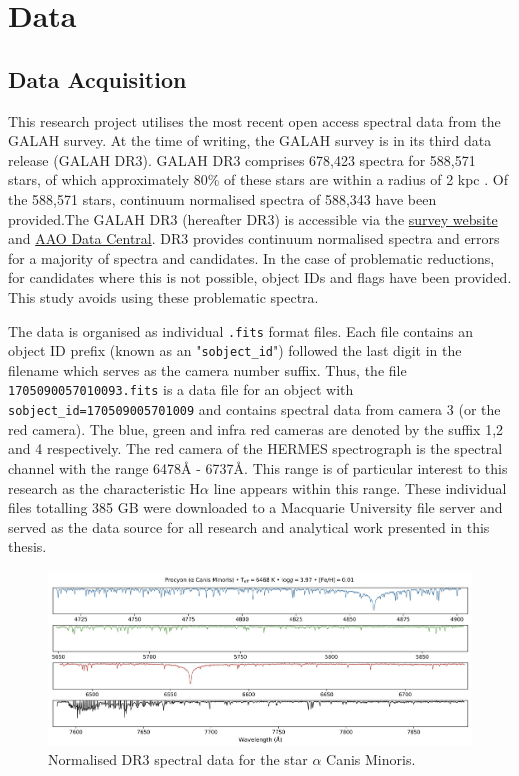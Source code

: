 \chapter{Data}

\section{Data Acquisition}

This research project utilises the most recent open access spectral data from the GALAH survey. At the time of writing, the GALAH survey is in its third data release (GALAH DR3). GALAH DR3 comprises 678,423 spectra for 588,571 stars, of which approximately 80\% of these stars are within a radius of 2 kpc \cite{buder2021galah+}. Of the 588,571 stars, continuum normalised spectra of 588,343 have been provided.The GALAH DR3 (hereafter DR3) is accessible via the \href{https://www.galah-survey.org/}{survey website} and \href{https://datacentral.org.au/}{AAO Data Central}. DR3 provides continuum normalised spectra and errors for a majority of spectra and candidates. In the case of problematic reductions, for candidates where this is not possible, object IDs and flags have been provided. This study avoids using these problematic spectra.

The data is organised as individual \texttt{.fits} format files. Each file contains an object ID prefix (known as an "\texttt{sobject\_id}") followed the last digit in the filename which serves as the camera number suffix. Thus, the file \texttt{1705090057010093.fits} is a data file for an object with \texttt{sobject\_id=170509005701009} and contains spectral data from camera 3 (or the red camera). The blue, green and infra red cameras are denoted by the suffix 1,2 and 4 respectively.
The red camera of the HERMES spectrograph is the spectral channel with the range 6478\r{A} - 6737\r{A}\cite{sheinis2014first}. This range is of particular interest to this research as the characteristic H$\alpha$ line appears within this range. These individual files totalling 385 GB were downloaded to a Macquarie University file server and served as the data source for all research and analytical work presented in this thesis.

\begin{figure}[h]
\centering
\includegraphics[scale=.25]{figures/galah cameras.jpeg}
\caption{Normalised DR3 spectral data for the star $\alpha$ Canis Minoris.}
\end{figure}

